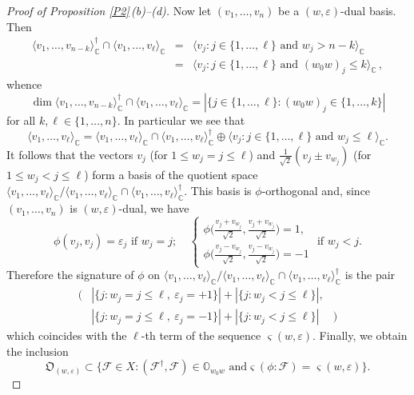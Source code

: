\documentclass{amsart}
\theoremstyle{definition}
\begin{document}
\begin{proof}[Proof of Proposition \ref{P2}\,{\rm (b)}--{\rm (d)}]
Now let $(v_1,\ldots,v_n)$ be a $(w,\varepsilon)$-dual basis. Then
\begin{eqnarray*}
\langle v_1,\ldots,v_{n-k}\rangle_\mathbb{C}^\dag\cap\langle
v_1,\ldots,v_\ell\rangle_\mathbb{C} & = & \langle
v_j:j\in\{1,\ldots,\ell\}\mbox{ and }w_j>n-k\rangle_\mathbb{C} \\
 & = & \langle
v_j:j\in\{1,\ldots,\ell\}\mbox{ and }(w_0w)_j\leq k\rangle_\mathbb{C}\,,
\end{eqnarray*}
whence
\[\dim\langle v_1,\ldots,v_{n-k}\rangle_\mathbb{C}^\dag\cap\langle v_1,\ldots,v_\ell\rangle_\mathbb{C}=|\{j\in\{1,\ldots,\ell\}:(w_0w)_j\in\{1,\ldots,k\}|\]
for all $k,\ell\in\{1,\ldots,n\}$. In particular we see that
\[\langle v_1,\ldots,v_\ell\rangle_\mathbb{C}=\langle v_1,\ldots,v_\ell\rangle_\mathbb{C}\cap\langle v_1,\ldots,v_\ell\rangle_\mathbb{C}^\dag\oplus\langle v_j:
j\in\{1,\ldots,\ell\}\mbox{ and }w_j\leq \ell\rangle_\mathbb{C}.\] It follows
that the vectors $v_j$ (for $1\leq w_j=j\leq \ell$) and
$\frac{1}{\sqrt{2}}(v_j\pm v_{w_j})$ (for $1\leq w_j<j\leq \ell$)
form a basis of the quotient space $\langle
v_1,\ldots,v_\ell\rangle_\mathbb{C}/\langle v_1,\ldots,v_\ell\rangle_\mathbb{C}\cap\langle
v_1,\ldots,v_\ell\rangle_\mathbb{C}^\dag$. This basis is $\phi$-orthogonal and,
since $(v_1,\ldots,v_n)$ is $(w,\varepsilon)$-dual, we have
\[
\textstyle \phi(v_j,v_j)=\varepsilon_j\mbox{ if $w_j=j$};\quad
\left\{\begin{array}{l}
\phi\big(\frac{v_j+v_{w_j}}{\sqrt{2}},\frac{v_j+v_{w_j}}{\sqrt{2}}\big)=1,\\[2mm]
\phi\big(\frac{v_j-v_{w_j}}{\sqrt{2}},\frac{v_j-v_{w_j}}{\sqrt{2}}\big)=-1
\end{array}\right.\mbox{ if $w_j<j$.}
\]
Therefore the signature of $\phi$ on $\langle
v_1,\ldots,v_\ell\rangle_\mathbb{C}/\langle v_1,\ldots,v_\ell\rangle_\mathbb{C}\cap\langle
v_1,\ldots,v_\ell\rangle_\mathbb{C}^\dag$ is the pair
\[
\begin{array}{rll}
\big( & |\{j:w_j=j\leq\ell,\
\varepsilon_j=+1\}|+|\{j:w_j<j\leq\ell\}|,
\\[2mm]
 & |\{j:w_j=j\leq\ell,\
\varepsilon_j=-1\}|+|\{j:w_j<j\leq\ell\}| & \big)\end{array}
\]
which coincides with the $\ell$-th term of the sequence
$\varsigma(w,\varepsilon)$. Finally, we obtain the inclusion
\begin{equation}
\label{4} \mathfrak{O}_{(w,\varepsilon)}\subset\big\{\mathcal{F}\in
X: (\mathcal{F}^\dag,\mathcal{F})\in\mathbb{O}_{w_0w}\mbox{ and
}\varsigma(\phi:\mathcal{F})=\varsigma(w,\varepsilon)\big\}.
\end{equation}


\end{proof}
\end{document}
